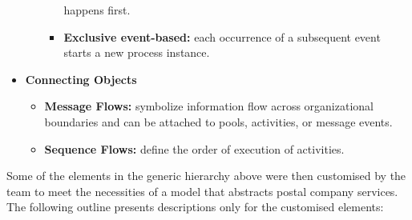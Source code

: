 \documentclass[11pt, a4paper, oneside, openright]{article}
\begin{document}
\begin{itemize}
\begin{itemize}
\begin{itemize}
      happens first.
      \item \textbf{Exclusive event-based:} each occurrence of a subsequent
      event starts a new process instance.
    \end{itemize}
  \end {itemize}
  \item \textbf{Connecting Objects}
  \begin{itemize}
    \item \textbf{Message Flows:} symbolize information flow across
    organizational boundaries and can be attached to pools, activities, or
    message events.
    \item \textbf{Sequence Flows:} define the order of execution of activities.
  \end{itemize}
\end{itemize}

Some of the elements in the generic hierarchy above were then customised by the
team to meet the necessities of a model that abstracts postal company services.
The following outline presents descriptions only for the customised elements:
\end{document}
